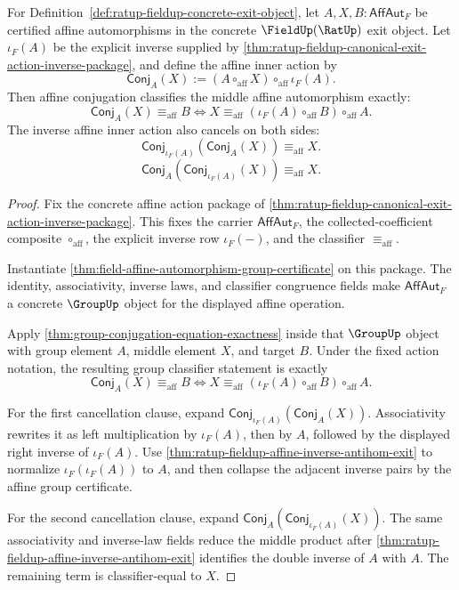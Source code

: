 \begin{theorem}
\label{thm:ratup-fieldup-affine-conjugation-equation-exactness}
For Definition~\ref{def:ratup-fieldup-concrete-exit-object}, let
$A,X,B:\mathsf{AffAut}_F$ be certified affine automorphisms in the concrete
$\FieldUp(\RatUp)$ exit object. Let $\iota_F(A)$ be the explicit inverse
supplied by
\autoref{thm:ratup-fieldup-canonical-exit-action-inverse-package}, and define
the affine inner action by
$$
\mathsf{Conj}_A(X):=(A\circ_{\mathrm{aff}}X)\circ_{\mathrm{aff}}\iota_F(A).
$$
Then affine conjugation classifies the middle affine automorphism exactly:
$$
\mathsf{Conj}_A(X)\equiv_{\mathrm{aff}}B
\Longleftrightarrow
X\equiv_{\mathrm{aff}}(\iota_F(A)\circ_{\mathrm{aff}}B)\circ_{\mathrm{aff}}A.
$$
The inverse affine inner action also cancels on both sides:
$$
\mathsf{Conj}_{\iota_F(A)}(\mathsf{Conj}_A(X))\equiv_{\mathrm{aff}}X.
$$
$$
\mathsf{Conj}_A(\mathsf{Conj}_{\iota_F(A)}(X))\equiv_{\mathrm{aff}}X.
$$
\end{theorem}
\begin{proof}
Fix the concrete affine action package of
\autoref{thm:ratup-fieldup-canonical-exit-action-inverse-package}. This fixes
the carrier $\mathsf{AffAut}_F$, the collected-coefficient composite
$\circ_{\mathrm{aff}}$, the explicit inverse row $\iota_F(-)$, and the
classifier $\equiv_{\mathrm{aff}}$.

Instantiate \autoref{thm:field-affine-automorphism-group-certificate} on this
package. The identity, associativity, inverse laws, and classifier congruence
fields make $\mathsf{AffAut}_F$ a concrete $\GroupUp$ object for the displayed
affine operation.

Apply \autoref{thm:group-conjugation-equation-exactness} inside that
$\GroupUp$ object with group element $A$, middle element $X$, and target $B$.
Under the fixed action notation, the resulting group classifier statement is
exactly
$$
\mathsf{Conj}_A(X)\equiv_{\mathrm{aff}}B
\Longleftrightarrow
X\equiv_{\mathrm{aff}}(\iota_F(A)\circ_{\mathrm{aff}}B)\circ_{\mathrm{aff}}A.
$$

For the first cancellation clause, expand
$\mathsf{Conj}_{\iota_F(A)}(\mathsf{Conj}_A(X))$. Associativity rewrites it as
left multiplication by $\iota_F(A)$, then by $A$, followed by the displayed
right inverse of $\iota_F(A)$. Use
\autoref{thm:ratup-fieldup-affine-inverse-antihom-exit} to normalize
$\iota_F(\iota_F(A))$ to $A$, and then collapse the adjacent inverse pairs by
the affine group certificate.

For the second cancellation clause, expand
$\mathsf{Conj}_A(\mathsf{Conj}_{\iota_F(A)}(X))$. The same associativity and
inverse-law fields reduce the middle product after
\autoref{thm:ratup-fieldup-affine-inverse-antihom-exit} identifies the double
inverse of $A$ with $A$. The remaining term is classifier-equal to $X$.
\end{proof}

